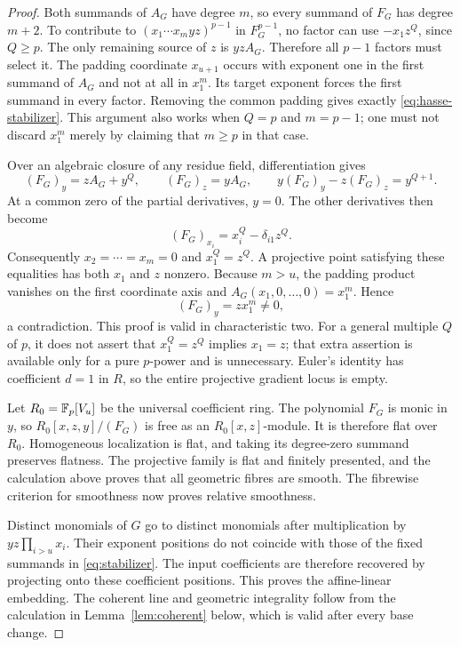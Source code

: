 \begin{proof}
Both summands of $A_G$ have degree $m$, so every summand of $F_G$ has degree $m+2$. To contribute to $(x_1\cdots x_myz)^{p-1}$ in $F_G^{p-1}$, no factor can use $-x_1z^Q$, since $Q\ge p$. The only remaining source of $z$ is $yzA_G$. Therefore all $p-1$ factors must select it. The padding coordinate $x_{u+1}$ occurs with exponent one in the first summand of $A_G$ and not at all in $x_1^m$. Its target exponent forces the first summand in every factor. Removing the common padding gives exactly \eqref{eq:hasse-stabilizer}. This argument also works when $Q=p$ and $m=p-1$; one must not discard $x_1^m$ merely by claiming that $m\ge p$ in that case.

Over an algebraic closure of any residue field, differentiation gives
\[
(F_G)_y=zA_G+y^Q,\qquad (F_G)_z=yA_G,
\qquad y(F_G)_y-z(F_G)_z=y^{Q+1}.
\]
At a common zero of the partial derivatives, $y=0$. The other derivatives then become
\[
(F_G)_{x_i}=x_i^Q-\delta_{i1}z^Q.
\]
Consequently $x_2=\cdots=x_m=0$ and $x_1^Q=z^Q$. A projective point satisfying these equalities has both $x_1$ and $z$ nonzero. Because $m>u$, the padding product vanishes on the first coordinate axis and $A_G(x_1,0,\ldots,0)=x_1^m$. Hence
\[
(F_G)_y=z x_1^m\ne0,
\]
a contradiction. This proof is valid in characteristic two. For a general multiple $Q$ of $p$, it does not assert that $x_1^Q=z^Q$ implies $x_1=z$; that extra assertion is available only for a pure $p$-power and is unnecessary. Euler's identity has coefficient $d=1$ in $R$, so the entire projective gradient locus is empty.

Let $R_0=\mathbb F_p[V_u]$ be the universal coefficient ring. The polynomial $F_G$ is monic in $y$, so $R_0[x,z,y]/(F_G)$ is free as an $R_0[x,z]$-module. It is therefore flat over $R_0$. Homogeneous localization is flat, and taking its degree-zero summand preserves flatness. The projective family is flat and finitely presented, and the calculation above proves that all geometric fibres are smooth. The fibrewise criterion for smoothness now proves relative smoothness.

Distinct monomials of $G$ go to distinct monomials after multiplication by $yz\prod_{i>u}x_i$. Their exponent positions do not coincide with those of the fixed summands in \eqref{eq:stabilizer}. The input coefficients are therefore recovered by projecting onto these coefficient positions. This proves the affine-linear embedding. The coherent line and geometric integrality follow from the calculation in Lemma~\ref{lem:coherent} below, which is valid after every base change.
\end{proof}

